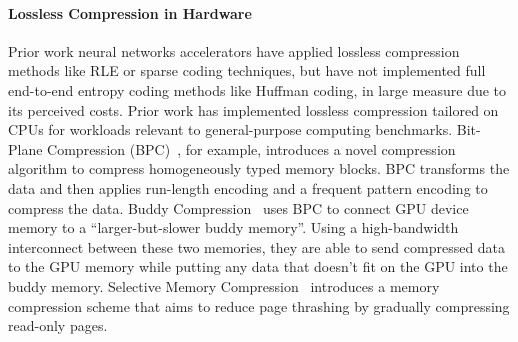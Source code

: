 
\paragraph{Lossless Compression in Hardware}
Prior work neural networks accelerators have applied lossless compression 
methods like RLE or sparse coding techniques, but have not implemented full end-to-end entropy coding methods like Huffman coding, in large measure due to its perceived costs. Prior work has implemented lossless compression tailored on CPUs for workloads relevant to general-purpose computing benchmarks.
Bit-Plane Compression (BPC)~\cite{kim2016bit}, for example, introduces a novel compression algorithm to compress homogeneously typed memory blocks. BPC transforms the data and then applies run-length encoding and a frequent pattern encoding to compress the data. 
Buddy Compression~\cite{choukse2020buddy} uses BPC to connect GPU device memory to a ``larger-but-slower buddy memory''. Using a high-bandwidth interconnect between these two memories, they are able to send compressed data to the GPU memory while putting any data that doesn't fit on the GPU into the buddy memory. Selective Memory Compression~\cite{nihaal2024selective} introduces a memory compression scheme that aims to reduce page thrashing by gradually compressing read-only pages. 




